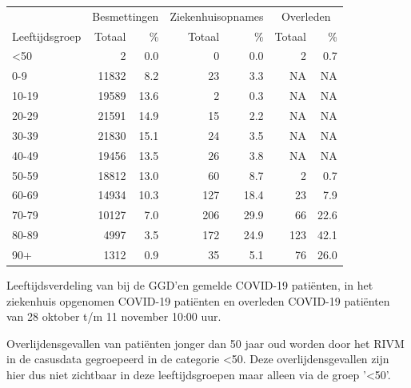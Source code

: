 \documentclass[
  english,
  man,floatsintext]{apa6}
\begin{document}
\begin{table}
\centering\begingroup\fontsize{11}{13}\selectfont

\begin{threeparttable}
\begin{tabular}{lrrrrrr}
\toprule
\multicolumn{1}{c}{ } & \multicolumn{2}{c}{Besmettingen} & \multicolumn{2}{c}{Ziekenhuisopnames} & \multicolumn{2}{c}{Overleden} \\
\cmidrule(l{3pt}r{3pt}){2-3} \cmidrule(l{3pt}r{3pt}){4-5} \cmidrule(l{3pt}r{3pt}){6-7}
Leeftijdsgroep & Totaal & \% & Totaal & \% & Totaal & \%\\
\midrule
<50 & 2 & 0.0 & 0 & 0.0 & 2 & 0.7\\
0-9 & 11832 & 8.2 & 23 & 3.3 & NA & NA\\
10-19 & 19589 & 13.6 & 2 & 0.3 & NA & NA\\
20-29 & 21591 & 14.9 & 15 & 2.2 & NA & NA\\
30-39 & 21830 & 15.1 & 24 & 3.5 & NA & NA\\
40-49 & 19456 & 13.5 & 26 & 3.8 & NA & NA\\
50-59 & 18812 & 13.0 & 60 & 8.7 & 2 & 0.7\\
60-69 & 14934 & 10.3 & 127 & 18.4 & 23 & 7.9\\
70-79 & 10127 & 7.0 & 206 & 29.9 & 66 & 22.6\\
80-89 & 4997 & 3.5 & 172 & 24.9 & 123 & 42.1\\
90+ & 1312 & 0.9 & 35 & 5.1 & 76 & 26.0\\
\bottomrule
\end{tabular}
\begin{tablenotes}
\item[1] Leeftijdsverdeling van bij de GGD’en gemelde COVID-19 patiënten, in het ziekenhuis opgenomen COVID-19 patiënten en overleden COVID-19 patiënten van 28 oktober t/m 11 november 10:00 uur.
\item[2] Overlijdensgevallen van patiënten jonger dan 50 jaar oud worden door het RIVM in de casusdata gegroepeerd in de categorie <50. Deze overlijdensgevallen zijn hier dus niet zichtbaar in deze leeftijdsgroepen maar alleen via de groep '<50'.
\end{tablenotes}
\end{threeparttable}
\endgroup{}
\end{table}

\newpage
\end{document}
